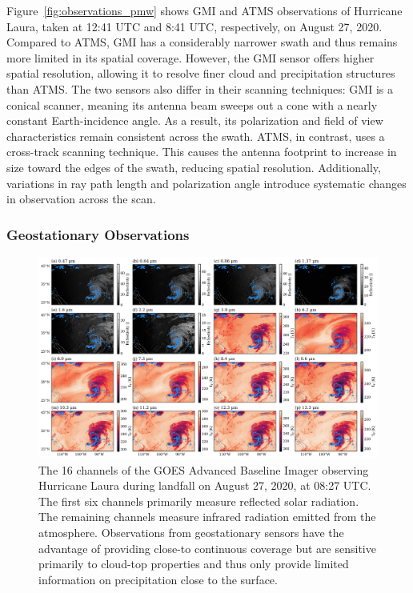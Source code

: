 \documentclass[11pt]{article}
\begin{document}
Figure~\ref{fig:observations_pmw} shows GMI and ATMS observations of Hurricane
Laura, taken at 12:41 UTC and 8:41 UTC, respectively, on August 27, 2020.
Compared to ATMS, GMI has a considerably narrower swath and thus remains more
limited in its spatial coverage. However, the GMI sensor offers higher spatial
resolution, allowing it to resolve finer cloud and precipitation structures than
ATMS. The two sensors also differ in their scanning techniques: GMI is a conical
scanner, meaning its antenna beam sweeps out a cone with a nearly constant
Earth-incidence angle. As a result, its polarization and field of view
characteristics remain consistent across the swath. ATMS, in contrast, uses a
cross-track scanning technique. This causes the antenna footprint to increase in
size toward the edges of the swath, reducing spatial resolution. Additionally,
variations in ray path length and polarization angle introduce systematic
changes in observation across the scan.

\subsubsection{Geostationary Observations}

\begin{figure}[htbp] %
	\centering
	\includegraphics[width=1.0\textwidth]{figures/fig03}
	\caption{
		The 16 channels of the GOES Advanced Baseline Imager observing Hurricane
		Laura during landfall on August 27, 2020, at 08:27 UTC. The first six
		channels primarily measure reflected solar radiation. The remaining
		channels measure infrared radiation emitted from the atmosphere.
		Observations from geostationary sensors have the advantage of providing
		close-to continuous coverage but are sensitive primarily to cloud-top
		properties and thus only provide limited information on precipitation
		close to the surface.
	}
	\label{fig:observations_geo}
\end{figure}
\end{document}
